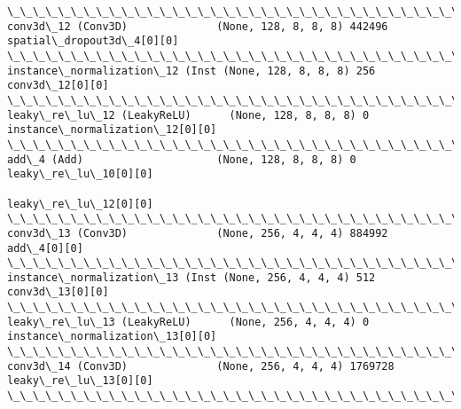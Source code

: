 \documentclass[11pt]{article}
\begin{document}
\begin{Verbatim}[commandchars=\\\{\}]
\_\_\_\_\_\_\_\_\_\_\_\_\_\_\_\_\_\_\_\_\_\_\_\_\_\_\_\_\_\_\_\_\_\_\_\_\_\_\_\_\_\_\_\_\_\_\_\_\_\_\_\_\_\_\_\_\_\_\_\_\_\_\_\_\_\_\_\_\_\_\_\_\_\_\_\_\_\_\_\_\_\_\_\_\_\_\_\_\_\_\_\_\_\_\_\_\_\_
conv3d\_12 (Conv3D)              (None, 128, 8, 8, 8) 442496      spatial\_dropout3d\_4[0][0]        
\_\_\_\_\_\_\_\_\_\_\_\_\_\_\_\_\_\_\_\_\_\_\_\_\_\_\_\_\_\_\_\_\_\_\_\_\_\_\_\_\_\_\_\_\_\_\_\_\_\_\_\_\_\_\_\_\_\_\_\_\_\_\_\_\_\_\_\_\_\_\_\_\_\_\_\_\_\_\_\_\_\_\_\_\_\_\_\_\_\_\_\_\_\_\_\_\_\_
instance\_normalization\_12 (Inst (None, 128, 8, 8, 8) 256         conv3d\_12[0][0]                  
\_\_\_\_\_\_\_\_\_\_\_\_\_\_\_\_\_\_\_\_\_\_\_\_\_\_\_\_\_\_\_\_\_\_\_\_\_\_\_\_\_\_\_\_\_\_\_\_\_\_\_\_\_\_\_\_\_\_\_\_\_\_\_\_\_\_\_\_\_\_\_\_\_\_\_\_\_\_\_\_\_\_\_\_\_\_\_\_\_\_\_\_\_\_\_\_\_\_
leaky\_re\_lu\_12 (LeakyReLU)      (None, 128, 8, 8, 8) 0           instance\_normalization\_12[0][0]  
\_\_\_\_\_\_\_\_\_\_\_\_\_\_\_\_\_\_\_\_\_\_\_\_\_\_\_\_\_\_\_\_\_\_\_\_\_\_\_\_\_\_\_\_\_\_\_\_\_\_\_\_\_\_\_\_\_\_\_\_\_\_\_\_\_\_\_\_\_\_\_\_\_\_\_\_\_\_\_\_\_\_\_\_\_\_\_\_\_\_\_\_\_\_\_\_\_\_
add\_4 (Add)                     (None, 128, 8, 8, 8) 0           leaky\_re\_lu\_10[0][0]             
                                                                 leaky\_re\_lu\_12[0][0]             
\_\_\_\_\_\_\_\_\_\_\_\_\_\_\_\_\_\_\_\_\_\_\_\_\_\_\_\_\_\_\_\_\_\_\_\_\_\_\_\_\_\_\_\_\_\_\_\_\_\_\_\_\_\_\_\_\_\_\_\_\_\_\_\_\_\_\_\_\_\_\_\_\_\_\_\_\_\_\_\_\_\_\_\_\_\_\_\_\_\_\_\_\_\_\_\_\_\_
conv3d\_13 (Conv3D)              (None, 256, 4, 4, 4) 884992      add\_4[0][0]                      
\_\_\_\_\_\_\_\_\_\_\_\_\_\_\_\_\_\_\_\_\_\_\_\_\_\_\_\_\_\_\_\_\_\_\_\_\_\_\_\_\_\_\_\_\_\_\_\_\_\_\_\_\_\_\_\_\_\_\_\_\_\_\_\_\_\_\_\_\_\_\_\_\_\_\_\_\_\_\_\_\_\_\_\_\_\_\_\_\_\_\_\_\_\_\_\_\_\_
instance\_normalization\_13 (Inst (None, 256, 4, 4, 4) 512         conv3d\_13[0][0]                  
\_\_\_\_\_\_\_\_\_\_\_\_\_\_\_\_\_\_\_\_\_\_\_\_\_\_\_\_\_\_\_\_\_\_\_\_\_\_\_\_\_\_\_\_\_\_\_\_\_\_\_\_\_\_\_\_\_\_\_\_\_\_\_\_\_\_\_\_\_\_\_\_\_\_\_\_\_\_\_\_\_\_\_\_\_\_\_\_\_\_\_\_\_\_\_\_\_\_
leaky\_re\_lu\_13 (LeakyReLU)      (None, 256, 4, 4, 4) 0           instance\_normalization\_13[0][0]  
\_\_\_\_\_\_\_\_\_\_\_\_\_\_\_\_\_\_\_\_\_\_\_\_\_\_\_\_\_\_\_\_\_\_\_\_\_\_\_\_\_\_\_\_\_\_\_\_\_\_\_\_\_\_\_\_\_\_\_\_\_\_\_\_\_\_\_\_\_\_\_\_\_\_\_\_\_\_\_\_\_\_\_\_\_\_\_\_\_\_\_\_\_\_\_\_\_\_
conv3d\_14 (Conv3D)              (None, 256, 4, 4, 4) 1769728     leaky\_re\_lu\_13[0][0]             
\_\_\_\_\_\_\_\_\_\_\_\_\_\_\_\_\_\_\_\_\_\_\_\_\_\_\_\_\_\_\_\_\_\_\_\_\_\_\_\_\_\_\_\_\_\_\_\_\_\_\_\_\_\_\_\_\_\_\_\_\_\_\_\_\_\_\_\_\_\_\_\_\_\_\_\_\_\_\_\_\_\_\_\_\_\_\_\_\_\_\_\_\_\_\_\_\_\_

\end{Verbatim}
\end{document}
